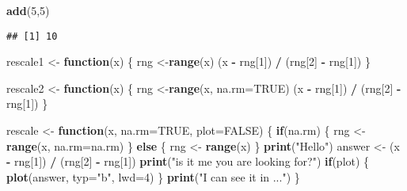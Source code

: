 \documentclass[]{article}
\newenvironment{Shaded}{\begin{snugshade}}{\end{snugshade}}
\newcommand{\ControlFlowTok}[1]{\textcolor[rgb]{0.13,0.29,0.53}{\textbf{#1}}}
\newcommand{\DataTypeTok}[1]{\textcolor[rgb]{0.13,0.29,0.53}{#1}}
\newcommand{\DecValTok}[1]{\textcolor[rgb]{0.00,0.00,0.81}{#1}}
\newcommand{\KeywordTok}[1]{\textcolor[rgb]{0.13,0.29,0.53}{\textbf{#1}}}
\newcommand{\NormalTok}[1]{#1}
\newcommand{\OperatorTok}[1]{\textcolor[rgb]{0.81,0.36,0.00}{\textbf{#1}}}
\newcommand{\OtherTok}[1]{\textcolor[rgb]{0.56,0.35,0.01}{#1}}
\newcommand{\StringTok}[1]{\textcolor[rgb]{0.31,0.60,0.02}{#1}}
\begin{document}
\begin{Shaded}
\begin{Highlighting}[]
\KeywordTok{add}\NormalTok{(}\DecValTok{5}\NormalTok{,}\DecValTok{5}\NormalTok{)}
\end{Highlighting}
\end{Shaded}

\begin{verbatim}
## [1] 10
\end{verbatim}

\begin{Shaded}
\begin{Highlighting}[]
\NormalTok{rescale1 <-}\StringTok{ }\ControlFlowTok{function}\NormalTok{(x) \{}
\NormalTok{  rng <-}\KeywordTok{range}\NormalTok{(x) }
\NormalTok{  (x }\OperatorTok{-}\StringTok{ }\NormalTok{rng[}\DecValTok{1}\NormalTok{]) }\OperatorTok{/}\StringTok{ }\NormalTok{(rng[}\DecValTok{2}\NormalTok{] }\OperatorTok{-}\StringTok{ }\NormalTok{rng[}\DecValTok{1}\NormalTok{]) }
\NormalTok{  \}}
\end{Highlighting}
\end{Shaded}

\begin{Shaded}
\begin{Highlighting}[]
\NormalTok{rescale2 <-}\StringTok{ }\ControlFlowTok{function}\NormalTok{(x) \{ }
\NormalTok{  rng <-}\KeywordTok{range}\NormalTok{(x, }\DataTypeTok{na.rm=}\OtherTok{TRUE}\NormalTok{) }
\NormalTok{  (x }\OperatorTok{-}\StringTok{ }\NormalTok{rng[}\DecValTok{1}\NormalTok{]) }\OperatorTok{/}\StringTok{ }\NormalTok{(rng[}\DecValTok{2}\NormalTok{] }\OperatorTok{-}\StringTok{ }\NormalTok{rng[}\DecValTok{1}\NormalTok{]) }
\NormalTok{\}}
\end{Highlighting}
\end{Shaded}

\begin{Shaded}
\begin{Highlighting}[]
\NormalTok{rescale <-}\StringTok{ }\ControlFlowTok{function}\NormalTok{(x, }\DataTypeTok{na.rm=}\OtherTok{TRUE}\NormalTok{, }\DataTypeTok{plot=}\OtherTok{FALSE}\NormalTok{) \{}
  \ControlFlowTok{if}\NormalTok{(na.rm) \{ }
\NormalTok{    rng <-}\KeywordTok{range}\NormalTok{(x, }\DataTypeTok{na.rm=}\NormalTok{na.rm) }
\NormalTok{    \} }\ControlFlowTok{else}\NormalTok{ \{ }
\NormalTok{      rng <-}\StringTok{ }\KeywordTok{range}\NormalTok{(x)}
\NormalTok{      \} }
  \KeywordTok{print}\NormalTok{(}\StringTok{"Hello"}\NormalTok{) }
\NormalTok{  answer <-}\StringTok{ }\NormalTok{(x }\OperatorTok{-}\StringTok{ }\NormalTok{rng[}\DecValTok{1}\NormalTok{]) }\OperatorTok{/}\StringTok{ }\NormalTok{(rng[}\DecValTok{2}\NormalTok{] }\OperatorTok{-}\StringTok{ }\NormalTok{rng[}\DecValTok{1}\NormalTok{]) }
  \KeywordTok{print}\NormalTok{(}\StringTok{"is it me you are looking for?"}\NormalTok{) }
  \ControlFlowTok{if}\NormalTok{(plot) \{ }
    \KeywordTok{plot}\NormalTok{(answer, }\DataTypeTok{typ=}\StringTok{"b"}\NormalTok{, }\DataTypeTok{lwd=}\DecValTok{4}\NormalTok{) }
\NormalTok{    \} }
  \KeywordTok{print}\NormalTok{(}\StringTok{"I can see it in ..."}\NormalTok{)}
\NormalTok{\}}
\end{Highlighting}
\end{Shaded}
\end{document}
